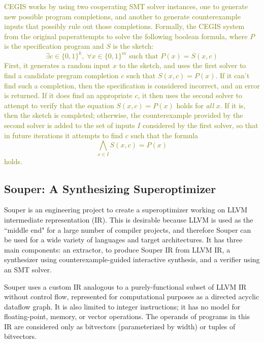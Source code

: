 \documentclass[12pt,twoside]{reedthesis}
\newcommand{\green}[1]{\textcolor{olive}{#1}}
\begin{document}
        \green{
        CEGIS works by using two cooperating SMT solver instances, one to generate new possible program completions, and another to generate counterexample inputs that possibly rule out those completions.
        Formally, the CEGIS system from the original paper\footnotemark attempts to solve the following boolean formula, where $P$ is the specification program and $S$ is the sketch:
        \[
            \exists c \in \{0,1\}^k,\; \forall x \in \{0,1\}^m \text{ such that } P(x) = S(x,c)
        \]
        First, it generates a random input $x$ to the sketch, and uses the first solver to find a candidate pregram completion $c$ such that $S(x,c) = P(x)$. 
        If it can't find such a completion, then the specification is considered incorrect, and an error is returned.
        If it does find an appropriate $c$, it then uses the second solver to attempt to verify that the equation $S(x,c) = P(x)$ holds for \textit{all} $x$.
        If it is, then the sketch is completed; otherwise, the counterexample provided by the second solver is added to the set of inputs $I$ considered by the first solver, so that in future iterations it attempts to find $c$ such that the formula
        \[
                \bigwedge_{x\in I} S(x, c) = P(x)
        \]
        holds.
        }

        
        \subsection{Souper: A Synthesizing Superoptimizer}
            Souper \cite{sasnauskas2017souper} is an engineering project to create a superoptimizer working on LLVM intermediate representation (IR).
            This is desirable because LLVM is used as the ``middle end" for a large number of compiler projects, and therefore Souper can be used for a wide variety of languages and target architectures.
            It has three main components:
                an extractor, to produce Souper IR from LLVM IR,
                a synthesizer using counterexample-guided interactive synthesis,
                and a verifier using an SMT solver.
            
            Souper uses a custom IR analogous to a purely-functional subset of LLVM IR without control flow\footnotemark, represented for computational purposes as a directed acyclic dataflow graph.
            It is also limited to integer instructions; it has no model for floating-point, memory, or vector operations.
            The operands of programs in this IR are considered only as bitvectors (parameterized by width) or tuples of bitvectors.
            
\end{document}
